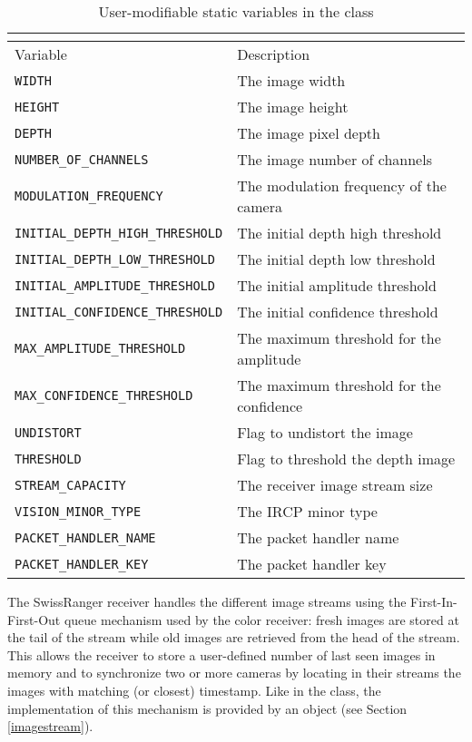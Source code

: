\begin{table}[ht]
\caption{User-modifiable static variables in the \SwissRangerReceiver{} class}
\begin{center}
\begin{tabular}{| l | l |}
	\multicolumn{2}{c}{\SwissRangerReceiver{}} \\
	\hline
	Variable & Description \\
	\hline \hline
	\texttt{WIDTH} 								& The image width \\
	\texttt{HEIGHT} 							& The image height \\
	\texttt{DEPTH} 								& The image pixel depth \\
	\texttt{NUMBER\_OF\_CHANNELS} 				& The image number of channels \\
	\texttt{MODULATION\_FREQUENCY} 			& The modulation frequency of the camera \\
	\texttt{INITIAL\_DEPTH\_HIGH\_THRESHOLD} 	& The initial depth high threshold \\
	\texttt{INITIAL\_DEPTH\_LOW\_THRESHOLD} 	& The initial depth low threshold \\
	\texttt{INITIAL\_AMPLITUDE\_THRESHOLD} 		& The initial amplitude threshold \\
	\texttt{INITIAL\_CONFIDENCE\_THRESHOLD} 	& The initial confidence threshold \\
	\texttt{MAX\_AMPLITUDE\_THRESHOLD} 		& The maximum threshold for the amplitude \\
	\texttt{MAX\_CONFIDENCE\_THRESHOLD} 		& The maximum threshold for the confidence \\
	\texttt{UNDISTORT} 						& Flag to undistort the image \\
	\texttt{THRESHOLD} 						& Flag to threshold the depth image \\
	\texttt{STREAM\_CAPACITY} 					& The receiver image stream size \\
	\texttt{VISION\_MINOR\_TYPE} 				& The IRCP minor type \\
	\texttt{PACKET\_HANDLER\_NAME} 			& The packet handler name \\
	\texttt{PACKET\_HANDLER\_KEY} 				& The packet handler key \\
	\hline
\end{tabular}
\end{center}
\label{swissrangerreceivervariables}
\end{table}

The Swiss\-Ranger receiver handles the different image streams using the First-In-First-Out queue mechanism 
used by the color receiver: fresh images are stored at the tail of the stream while old images are retrieved 
from the head of the stream. This allows the receiver to store a user-defined number of last seen images in 
memory and to synchronize two or more cameras by locating in their streams the images with matching (or 
closest) timestamp. Like in the \ColorReceiver{} class, the implementation of this mechanism is provided by an 
\ImageStream{} object (see Section \ref{imagestream}).
